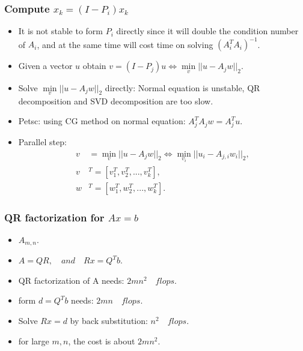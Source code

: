 \documentclass{beamer}
\begin{document}
\begin{frame}
 \frametitle{Compute $x_{k}=(I-P_{i})x_{k}$}
 \begin{itemize}
  \item It is not stable to form $P_{i}$ directly since it will double the condition number of $A_{i}$, and at the same time will cost time on solving
        $(A^{T}_{i}A_{i})^{-1}$.
  \item Given a vector $u$ obtain $v=(I-P_{j})u \Leftrightarrow \min\limits_{v}||u-A_{j}w||_{2}$.
  \item Solve $\min\limits_{v}||u-A_{j}w||_{2}$ directly: Normal equation is unstable, QR decomposition and SVD decomposition are too slow.
  \item Petsc: using CG method on normal equation: $A_{j}^{T}A_{j}w=A_{j}^{T}u$.
  \item Parallel step:
        \begin{equation*}
            \begin{split}
                v&=\min\limits_{v}||u-A_{j}w||_{2}\Leftrightarrow \min\limits_{v_{i}}||u_{i}-A_{j,i}w_{i}||_{2},\\
                v&^{T}=[v_{1}^{T},v_{2}^{T},...,v_{k}^{T}],\\
                w&^{T}=[w_{1}^{T},w_{2}^{T},...,w_{k}^{T}].
            \end{split}
        \end{equation*}
 \end{itemize}


\end{frame}


\begin{frame}
\frametitle{QR factorization for $Ax=b$}
\begin{itemize}
  \item $A_{m,n}$.
  \item $A=QR,\quad and\quad Rx=Q^{T}b$.
  \item QR factorization of A needs: $2mn^2 \quad flops$.
  \item form $d=Q^{T}b$ needs: $2mn \quad flops$.
  \item Solve $Rx=d$ by back substitution: $n^2 \quad flops$.
  \item for large $m, n$, the cost is about $2mn^2$.
\end{itemize}
\end{frame}
\end{document}

